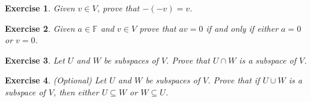 \documentclass{article}
\theoremstyle{plain}
\newtheorem{Q}{Exercise}{\bfseries}{\upshape}
\newcommand{\bF}{\mathbb{F}}
\begin{document}
\begin{Q}
Given $v\in V$, prove that $-(-v)= v$.
\end{Q}
\begin{comment}
\textbf{Solution:}
We know $v+ (-v) = 0$, so $-(-v) = v$, as additive inverses are unique, by proposition \ref{P:LA1props}(2).
\end{comment}

\begin{Q}
Given $a\in \bF$ and $v\in V$ prove that $av = 0$ if and only if either $a=0$ or $v=0$.
\end{Q}
\begin{comment}
\textbf{Solution:}
If $a=0$ then $av = 0$ by proposition \ref{P:LA1props}(3). Now, let $v=0$, and suppose $a\neq 0$. Let $w$ be any vector. Then $a0 + w = a0 + aa^{-1}w = a(0+a^{-1}w) = a(a^{-1}w)= 1w = w$. So $a0 = 0$, as the zero of a vector space is unique (by proposition \ref{P:LA1props}(1)). Conversely, suppose $av = 0 $ and that $a\neq 0$. Then $a^{-1}a v = a^{-1} 0 = 0$, and so $v = 0$, as $aa^{-1}=1$.
\end{comment}

\begin{Q}\label{\prefix Q:LA1cap}
Let $U$ and $W$ be subspaces of $V$. Prove that $U\cap W$ is a subspace of $V$.
\end{Q}
\begin{comment}
\textbf{Solution:}
We need to check the three conditions of definition \ref{D:LA1subs}. First, $0$ is obviously in $U\cap W$, as both $U$ and $W$ are subspaces. Second, if $u,v\in U\cap W$, then $u,v\in U$ and $u,v\in W$, and, as both $U$ and $W$ are closed under addition (as they are subspaces), we have $u+v\in U\cap W$. Finally, if $v\in U\cap W$ then $v\in U$ and $v\in W$, so $\alpha v\in U\cap W$ for all $\alpha$ as both $U$ and $W$ are closed under scalar multiplication. 
\end{comment}

\begin{Q}(Optional)
Let $U$ and $W$ be subspaces of $V$. Prove that if $U\cup W$ is a subspace of $V$, then either $U\subseteq W$ or $W\subseteq U$.
\end{Q}
\begin{comment}
\textbf{Solution:}
Suppose $U\cup W$ is a subspace of $V$, and suppose $U$ is not a subspace of $W$. Choose $u\in U\setminus W$, and let $w\in W$. Then $u + w \in U\cup W$, as $U\cup W$ is a subspace, and so is closed under $+$. So either $u+w \in U$ or $u+w \in W$. If $u+w\in W$, then $u+w-w = u$ is also in $W$, but this contradicts the choice of $u$. So $u+w\in U$, and so $u+w-u = w\in U$. This is true for all $w\in W$, so $W$ is a subspace of $U$.
\end{comment}
\end{document}
